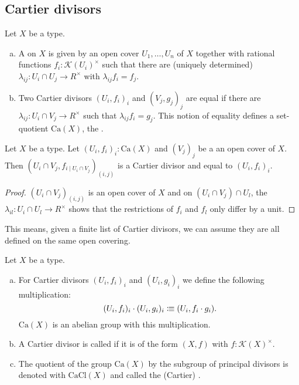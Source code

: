 \subsection{Cartier divisors}

\begin{definition}
  Let $X$ be a type.
  \begin{enumerate}[(a)]
  \item A  on $X$ is given by an open cover $U_1,\dots,U_n$ of $X$
    together with rational functions $f_i:\mathcal K(U_i)^\times$
    such that there are (uniquely determined) $\lambda_{ij}:U_i\cap U_j \to R^\times$ with $\lambda_{ij} f_i =f_j$.
  \item Two Cartier divisors $(U_i,f_i)_i$ and $(V_j,g_j)_j$ are equal
    if there are $\lambda_{ij}:U_i\cap V_j \to R^\times$ such that $\lambda_{ij}f_i=g_j$.
    This notion of equality defines a set-quotient $\mathrm{Ca}(X)$, the .
  \end{enumerate}
\end{definition}

\begin{lemma}
  Let $X$ be a type.
  Let $(U_i,f_i)_i:\mathrm{Ca}(X)$ and $(V_j)_j$ be a an open cover of $X$.
  Then $(U_i\cap V_j, f_{i\mid U_i\cap V_j})_{(i,j)}$ is a Cartier divisor and equal to $(U_i,f_i)_i$.
\end{lemma}

\begin{proof}
  $(U_i\cap V_j)_{(i,j)}$ is an open cover of $X$ and on $(U_i \cap V_j)\cap U_l$, the $\lambda_{il}:U_i\cap U_l\to R^\times$
  shows that the restrictions of $f_i$ and $f_l$ only differ by a unit.
\end{proof}

This means, given a finite list of Cartier divisors, we can assume they are all defined on the same open covering.

\begin{definition}
  Let $X$ be a type.
  \begin{enumerate}[(a)]
  \item For Cartier divisors $(U_i,f_i)_i$ and $(U_i,g_i)_i$ we define the following multiplication:
    \[
      (U_i,f_i)_i\cdot (U_i,g_i)_i \colonequiv (U_i,f_i\cdot g_i)
      \rlap{.}
    \]
    $\mathrm{Ca}(X)$ is an abelian group with this multiplication.
  \item A Cartier divisor is called  if it is of the form $(X,f)$ with $f:\mathcal K(X)^\times$.
  \item The quotient of the group $\mathrm{Ca}(X)$ by the subgroup of principal divisors is denoted with $\mathrm{CaCl}(X)$
    and called the (Cartier) .
  \end{enumerate}
\end{definition}


